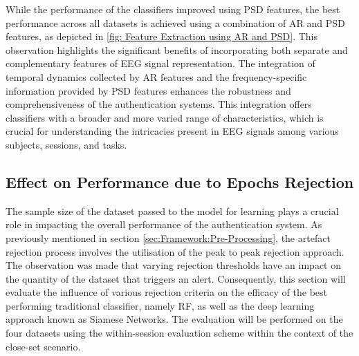 While the performance of the classifiers improved using PSD features, the best performance across all datasets is achieved using a combination of AR and PSD features, as depicted in \ref{fig: Feature Extraction using AR and PSD}. This observation highlights the significant benefits of incorporating both separate and complementary features of EEG signal representation. The integration of temporal dynamics collected by AR features and the frequency-specific information provided by PSD features enhances the robustness and comprehensiveness of the authentication systems. This integration offers classifiers with a broader and more varied range of characteristics, which is crucial for understanding the intricacies present in EEG signals among various subjects, sessions, and tasks.

\subsection{Effect on Performance due to Epochs Rejection}
\label{sec:Evaluation:Results:Effect due to different sample size}
The sample size of the dataset passed to the model for learning plays a crucial role in impacting the overall performance of the authentication system. As previously mentioned in section \ref{sec:Framework:Pre-Processing}, the artefact rejection process involves the utilisation of the peak to peak rejection approach. The observation was made that varying rejection thresholds have an impact on the quantity of the dataset that triggers an alert. Consequently, this section will evaluate the influence of various rejection criteria on the efficacy of the best performing traditional classifier, namely RF, as well as the deep learning approach known as Siamese Networks. The evaluation will be performed on the four datasets using the within-session evaluation scheme within the context of the close-set scenario.
\smallskip

    

